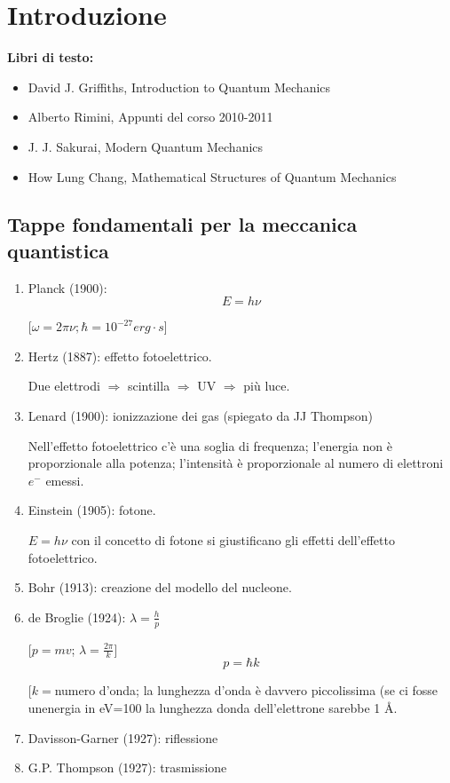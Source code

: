 \chapter*{Introduzione} %
\textbf{Libri di testo:}
\begin{itemize}
\item David J. Griffiths, Introduction to Quantum Mechanics
\item Alberto Rimini, Appunti del corso 2010-2011
\item J. J. Sakurai, Modern Quantum Mechanics
\item How Lung Chang, Mathematical Structures of Quantum Mechanics
\end{itemize}

\section*{Tappe fondamentali per la meccanica quantistica} %
\label{sec:tappe_fondamentali}
\begin{enumerate}
\item Planck (1900): 
\begin{equation}
E=h\nu 
\end{equation}

[$\omega =2\pi \nu; \hbar =10^{-27} erg\cdot s $]
\item Hertz (1887): effetto fotoelettrico.

Due elettrodi $\Longrightarrow$ scintilla $\Longrightarrow$ UV $\Longrightarrow $ più luce.
\item Lenard (1900): ionizzazione dei gas (spiegato da JJ Thompson)

Nell'effetto fotoelettrico c'è una soglia di frequenza; l'energia non è proporzionale alla potenza; l'intensità è proporzionale al numero di elettroni $e^-$ emessi.
\item Einstein (1905): fotone.

$E=h\nu $ con il concetto di fotone si giustificano gli effetti dell'effetto fotoelettrico.
\item Bohr (1913): creazione del modello del nucleone.
\item de Broglie (1924): $\lambda =\frac{h}{p}$

[$p=mv$; $\lambda =\frac{2\pi }{k}$]
\begin{equation}
p=\hbar k
\end{equation}

[$k=$numero d'onda; la lunghezza d'onda è davvero piccolissima (se ci fosse unenergia in eV=100 la lunghezza donda dell'elettrone sarebbe 1 \AA .
\item Davisson-Garner (1927): riflessione
\item G.P. Thompson (1927): trasmissione
\end{enumerate}

